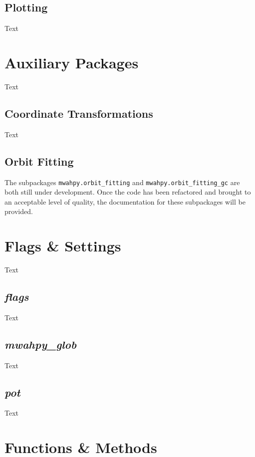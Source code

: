 \documentclass{article}
\begin{document}
\subsection{Plotting}

Text

\section{Auxiliary Packages}

Text

\subsection{Coordinate Transformations}

Text

\subsection{Orbit Fitting}

The subpackages \verb!mwahpy.orbit_fitting! and \verb!mwahpy.orbit_fitting_gc! are both still under development. Once the code has been refactored and brought to an acceptable level of quality, the documentation for these subpackages will be provided. 

\section{Flags \& Settings}

Text

\subsection{\textit{flags}}

Text

\subsection{\textit{mwahpy\_glob}}

Text

\subsection{\textit{pot}}

Text

\section{Functions \& Methods}
\end{document}
